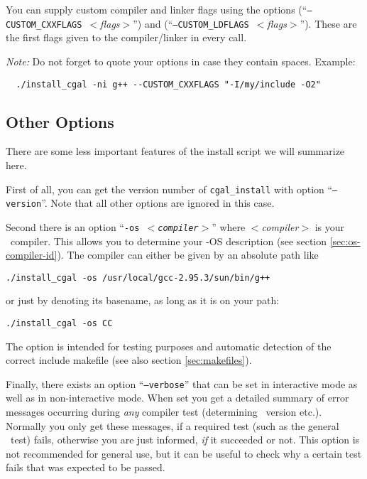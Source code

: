 You can supply custom compiler and linker flags using the options
\mbox{(``\texttt{--CUSTOM\_CXXFLAGS}
  \textit{$<$flags$>$}'')} and
\mbox{(``\texttt{--CUSTOM\_LDFLAGS}
  \textit{$<$flags$>$}'')}.  These are the
first flags given to the compiler/linker in every call.

\textit{Note:} Do not forget to quote your options in case they
contain spaces. Example:
\begin{verbatim}
  ./install_cgal -ni g++ --CUSTOM_CXXFLAGS "-I/my/include -O2"
\end{verbatim}

\subsection{Other Options}\label{sec:other-options}

There are some less important features of the install script we will
summarize here.

First of all, you can get the version number of \texttt{cgal\_install}
with option ``\texttt{--version}''. Note that all other options are
ignored in this case.

Second there is an option ``\texttt{-os \textit{$<$compiler$>$}}''
where \textit{$<$compiler$>$} is your \CC\ compiler. This allows you
to determine your \cgal-OS description (see section
\ref{sec:os-compiler-id}). The compiler can either be given by an
absolute path like
\begin{verbatim}
./install_cgal -os /usr/local/gcc-2.95.3/sun/bin/g++
\end{verbatim}
or just by denoting its basename, as long as it is on your path:
\begin{verbatim}
./install_cgal -os CC
\end{verbatim}
The option is intended for testing purposes and automatic detection of
the correct include makefile (see also section \ref{sec:makefiles}).

Finally, there exists an option
``\texttt{--verbose}'' that
can be set in interactive mode as well as in non-interactive mode.
When set you get a detailed summary of error messages occurring during
\textit{any} compiler test (determining \stl\ version etc.). Normally
you only get these messages, if a required test (such as the general
\stl\ test) fails, otherwise you are just informed, \textit{if} it
succeeded or not.  This option is not recommended for general use, but
it can be useful to check why a certain test fails that was expected
to be passed.

